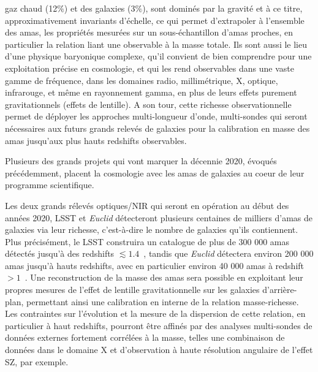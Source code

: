 gaz chaud (12$\%$) et des galaxies (3$\%$), sont dominés par la
gravité et à ce titre, approximativement invariants d'échelle, ce qui
permet d'extrapoler à l'ensemble des amas, les propriétés mesurées sur
un sous-échantillon d'amas proches, en particulier la relation liant
une observable à la masse totale. Ils sont aussi le lieu d’une
physique baryonique complexe, qu’il convient de bien comprendre pour
une exploitation précise en cosmologie, et qui les rend
observables dans une vaste gamme de fréquence, dans les domaines
radio, millimétrique, X, optique, infrarouge, et même en rayonnement
gamma, en plus de leurs effets purement gravitationnels (effets de
lentille). A son tour, cette richesse observationnelle permet de
déployer les approches multi-longueur d’onde, multi-sondes
qui seront nécessaires aux futurs grands relevés de galaxies pour la
calibration en masse des amas jusqu'aux plus hauts redshifts observables. 

Plusieurs des grands projets qui vont marquer la décennie 2020, évoqués
précédemment, placent la cosmologie avec les amas de galaxies au coeur
de leur programme scientifique.

Les deux grands rélevés optiques/NIR qui seront en opération au début
des années 2020, LSST et \emph{Euclid} détecteront plusieurs centaines
de milliers d'amas de galaxies via leur richesse,
c'est-à-dire le nombre de galaxies qu'ils contiennent. Plus
précisément, le LSST construira un catalogue de plus de 300 000 amas
détectés jusqu'à des redshifts $\lesssim 1.4$~\citep{LSST2019}, tandis
que \emph{Euclid} détectera environ 200 000 amas jusqu'à hauts
redshifts, avec en particulier environ 40 000 amas à redshift
$>1$~\citep{Sartoris2016, Adam2019_euclid}. Une reconstruction de la
masse des amas sera possible en exploitant leur propres mesures de l'effet de
lentille gravitationnelle sur les galaxies d'arrière-plan, permettant
ainsi une calibration en interne de la relation
masse-richesse. Les contraintes sur l'évolution et la mesure de la
dispersion de cette relation, en particulier à haut redshifts,
pourront être affinés par des analyses multi-sondes de données
externes fortement corrélées à la masse, telles une combinaison de
données dans le domaine X et d'observation à haute résolution
angulaire de l'effet SZ, par exemple.

